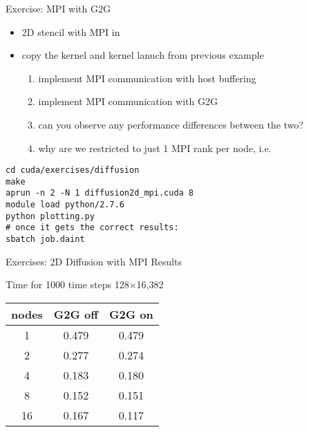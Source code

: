 \begin{frame}[fragile]{Exercise: MPI with G2G}
    \begin{itemize}
        \item 2D stencil with MPI in 
        \item copy the kernel and kernel lanuch from previous example
        \begin{enumerate}
            \item implement MPI communication with host buffering
            \item implement MPI communication with G2G
            \item can you observe any performance differences between the two?
            \item why are we restricted to just 1 MPI rank per node, i.e. 
        \end{enumerate}
    \end{itemize}

    \begin{code}{}
        \begin{lstlisting}[style=boxcudatiny]
cd cuda/exercises/diffusion
make
aprun -n 2 -N 1 diffusion2d_mpi.cuda 8
module load python/2.7.6
python plotting.py
# once it gets the correct results:
sbatch job.daint
        \end{lstlisting}
   \end{code}

\end{frame}

\begin{frame}[fragile]{Exercises: 2D Diffusion with MPI Results}
   \begin{info}{Time for 1000 time steps \@ 128$\times$16,382}
       \begin{center}
           \begin{tabular}{ccc}
               \hline
               nodes   &   G2G off & G2G on \\
                \hline
                1      &   0.479   & 0.479  \\
                2      &   0.277   & 0.274  \\
                4      &   0.183   & 0.180  \\
                8      &   0.152   & 0.151  \\
               16      &   0.167   & 0.117  \\
           \end{tabular}
       \end{center}
   \end{info}
\end{frame}

